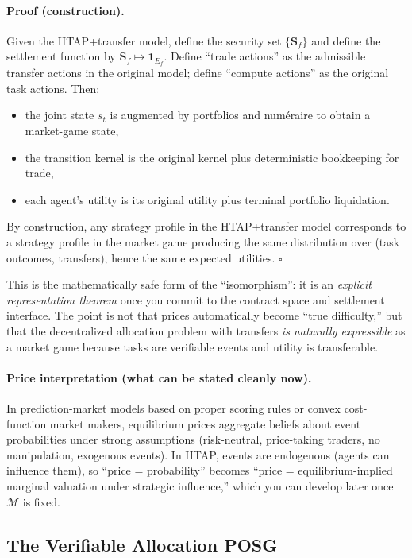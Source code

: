 \paragraph{Proof (construction).}
Given the HTAP+transfer model, define the security set \(\{\mathbf{S}_f\}\) and define the settlement function by \(\mathbf{S}_f\mapsto \mathbf{1}_{E_f}\). Define ``trade actions'' as the admissible transfer actions in the original model; define ``compute actions'' as the original task actions. Then:
\begin{itemize}
\item the joint state \(s_t\) is augmented by portfolios and num\'eraire to obtain a market-game state,
\item the transition kernel is the original kernel plus deterministic bookkeeping for trade,
\item each agent's utility is its original utility plus terminal portfolio liquidation.
\end{itemize}
By construction, any strategy profile in the HTAP+transfer model corresponds to a strategy profile in the market game producing the same distribution over (task outcomes, transfers), hence the same expected utilities. \(\square\)

This is the mathematically safe form of the ``isomorphism'': it is an \emph{explicit representation theorem} once you commit to the contract space and settlement interface. The point is not that prices automatically become ``true difficulty,'' but that the decentralized allocation problem with transfers \emph{is naturally expressible} as a market game because tasks are verifiable events and utility is transferable.

\paragraph{Price interpretation (what can be stated cleanly now).}
In prediction-market models based on proper scoring rules or convex cost-function market makers, equilibrium prices aggregate beliefs about event probabilities under strong assumptions (risk-neutral, price-taking traders, no manipulation, exogenous events). In HTAP, events are endogenous (agents can influence them), so ``price = probability'' becomes ``price = equilibrium-implied marginal valuation under strategic influence,'' which you can develop later once \(\mathcal{M}\) is fixed.

\subsection{The Verifiable Allocation POSG}

